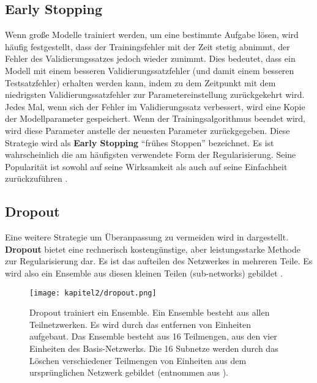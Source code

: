         \subsection{Early Stopping}
        Wenn große Modelle trainiert werden, um eine bestimmte Aufgabe lösen, wird häufig festgestellt, dass der Trainingsfehler mit der Zeit stetig abnimmt, der Fehler des Validierungssatzes jedoch wieder zunimmt. Dies bedeutet, dass ein Modell mit einem besseren Validierungssatzfehler (und damit einem besseren Testsatzfehler) erhalten werden kann, indem zu dem Zeitpunkt mit dem niedrigsten Validierungssatzfehler zur Parametereinstellung zurückgekehrt wird. Jedes Mal, wenn sich der Fehler im Validierungssatz verbessert, wird eine Kopie der Modellparameter gespeichert. Wenn der Trainingsalgorithmus beendet wird, wird diese Parameter anstelle der neuesten Parameter zurückgegeben. Diese Strategie wird als \textbf{Early Stopping} \enquote{frühes Stoppen} bezeichnet. Es ist wahrscheinlich die am häufigsten verwendete Form der Regularisierung. Seine Popularität ist sowohl auf seine Wirksamkeit als auch auf seine Einfachheit zurückzuführen \cite*[246]{IanGoodfellowYoshuaBengio2016}.


        \subsection{Dropout}
        Eine weitere Strategie um Überanpassung zu vermeiden wird in \cite*{Srivastava2014} dargestellt. \textbf{Dropout} bietet eine rechnerisch kostengünstige, aber leistungsstarke Methode zur Regularisierung dar. Es ist das aufteilen des Netzwerkes in mehreren Teile. Es wird also ein Ensemble aus diesen kleinen Teilen (sub-networks) gebildet \cite*[258]{IanGoodfellowYoshuaBengio2016}.



        \begin{figure}[H]
            \centering
            \texttt{[image: kapitel2/dropout.png]}
            \caption[Basis-Netzwerks und Ensemble im Vergleich]{Dropout trainiert ein Ensemble. Ein Ensemble besteht aus allen Teilnetzwerken. Es wird durch das entfernen von Einheiten aufgebaut. Das Ensemble besteht aus 16 Teilmengen, aus den vier Einheiten des Basis-Netzwerks. Die 16 Subnetze werden durch das Löschen verschiedener Teilmengen von Einheiten aus dem ursprünglichen Netzwerk gebildet (entnommen aus \cite*[260]{IanGoodfellowYoshuaBengio2016}).}
            \label{Kap2:Dropout}
        \end{figure}

